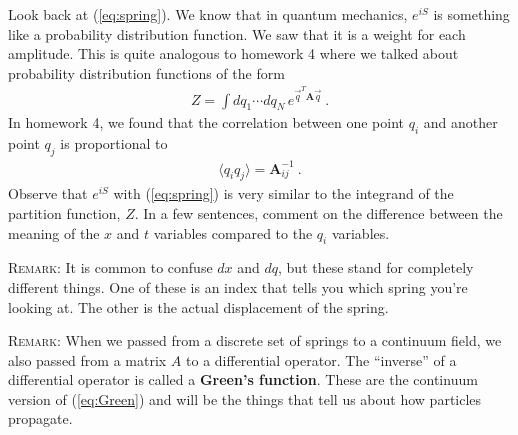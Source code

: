 \documentclass[12pt]{article}
\begin{document}
Look back at (\ref{eq:spring}). We know that in quantum mechanics, $e^{iS}$ is something like a probability distribution function. We saw that it is a weight for each amplitude. This is quite analogous to homework 4 where we talked about probability distribution functions of the form
\begin{align}
	Z =\int dq_1 \cdots dq_N \,e^{\vec q^T \textbf{A} \vec q}  \ .
\end{align}
In homework 4, we found that the correlation between one point $q_i$ and another point $q_j$ is proportional to 
\begin{align}
	\langle q_i q_j \rangle = \mathbf{A}_{ij}^{-1} \ .
	\label{eq:Green}
\end{align}
Observe that $e^{iS}$ with (\ref{eq:spring}) is very similar to the integrand of the partition function, $Z$. In a few sentences, comment on the difference between the meaning of the $x$ and $t$ variables compared to the $q_i$ variables. 

\textsc{Remark}: It is common to confuse $dx$ and $dq$, but these stand for completely different things. One of these is an index that tells you which spring you're looking at. The other is the actual displacement of the spring.

\textsc{Remark}: When we passed from a discrete set of springs to a continuum field, we also passed from a matrix $A$ to a differential operator. The ``inverse'' of a differential operator is called a \textbf{Green's function}. These are the continuum version of (\ref{eq:Green}) and will be the things that tell us about how particles propagate.


%
%

\end{document}
